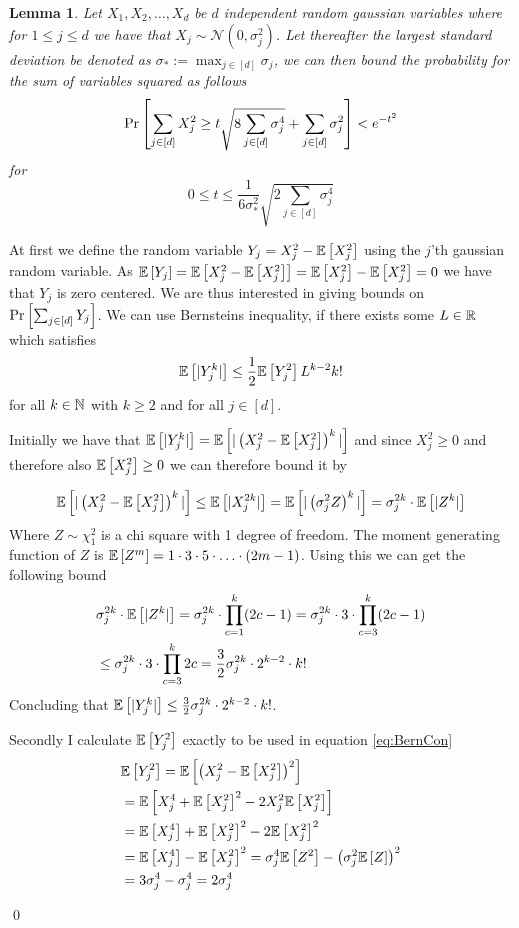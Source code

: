 \documentclass[a4paper,12pt]{article}
\renewenvironment{proof}{{\textit{Proof} \\}}{\qed}
\newtheorem{lemma}{Lemma}[section]
\begin{document}
\begin{lemma}
\label{lem:Bernstein}
Let $X_1, X_2, \dots , X_d$ be $d$ independent random gaussian variables 
where for $ 1 \le j \le d$ we have that $X_j \sim \mathcal{N}(0, \sigma_j^2)$.
Let thereafter the largest standard deviation be denoted as $\sigma_* := \max_{j \in [d]} \sigma_j$,
we can then bound the probability for the sum of variables squared as follows 
\[
\Pr\left [\sum_{j \in [d]} X_j^2  \ge 
    t \sqrt{8 \sum_{j \in [d]} \sigma_j^4} +
    \sum_{j \in [d]} \sigma_j^2  \right] < e^{-t^2}
\]
for
\[
0 \le t \le 
    \frac{1}{6 \sigma_*^2} \sqrt{2 \sum_{j \in [d]} \sigma_j^4}
\]
\end{lemma}
\begin{proof}
At first we define the random variable $Y_j = X_j^2 - \mathbb{E} \left [ X_j^2  \right]$ 
using the $j$'th gaussian random variable.
As $\mathbb{E} \left [ Y_j  \right] = \mathbb{E} \left [ X_j^2 - \mathbb{E} \left [ X_j^2  \right]  \right] = \mathbb{E} \left [ X_j^2  \right] - \mathbb{E} \left [ X_j^2  \right] = 0$ 
we have that $Y_j$ is zero centered. We are thus interested in giving bounds on
$\Pr\left [\sum_{j \in [d]} Y_j \right]$. 
We can use Bernsteins inequality, if there exists some $L \in \mathbb{R}$ which satisfies 
\begin{equation}
\label{eq:BernCon}
    \mathbb{E} \left [  |Y^k_j|   \right] \le \frac{1}{2} \mathbb{E} \left [ Y_j^2  \right] L^{k-2} k!
\end{equation}
for all $k \in \mathbb{N}$ with $k \ge 2$ and for all $j \in [d]$. \cite{wainwright_2019}

Initially we have that $\mathbb{E} \left [  |Y_j^k|   \right] = \mathbb{E} \left [  |\left (X_j^2 - \mathbb{E} \left [ X_j^2  \right]\right)^k|  \right]$
and since $X_j^2 \ge 0$ and therefore also $\mathbb{E} \left [ X_j^2  \right] \ge 0$ 
we can therefore bound it by

\[
    \mathbb{E} \left [  |\left (X_j^2 - \mathbb{E} \left [ X_j^2  \right]\right)^k|  \right] \le \mathbb{E} \left [  | X_j^{2k} |   \right] =
    \mathbb{E} \left [  | \left (\sigma_j^2 Z\right)^{k} |   \right] = 
    \sigma_j^{2k} \cdot \mathbb{E} \left [  |Z^{k} |   \right]
\]
Where $Z \sim \chi^2_1$ is a chi square with 1 degree of freedom.
The moment generating function of $Z$ is 
$\mathbb{E} \left [ Z^m  \right] = 1 \cdot 3 \cdot 5 \cdot \ldots \cdot (2m - 1) $.
Using this we can get the following bound
\begin{align*}
    &\sigma_j^{2k} \cdot \mathbb{E} \left [  |Z^{k} |   \right] =
    \sigma_j^{2k} \cdot \prod_{c=1}^k(2c-1) =
    \sigma_j^{2k} \cdot 3\cdot \prod_{c=3}^k (2c-1) \\
    &\le \sigma_j^{2k} \cdot 3 \cdot \prod_{c=3}^k 2c
    = \frac{3}{2}\sigma_j^{2k} \cdot 2^{k-2} \cdot k!
\end{align*}
Concluding that $\mathbb{E} \left [  |Y_j^k|   \right] \le \frac{3}{2}\sigma_j^{2k} \cdot 2^{k-2} \cdot k!$.

\noindent Secondly I calculate $\mathbb{E} \left [ Y_j^2  \right]$ exactly to be used in equation \ref{eq:BernCon}
\begin{align}
\label{eq:ExpY2:1}
    &\mathbb{E} \left [ Y_j^2  \right] = 
    \mathbb{E} \left [ \left (X_j^2 - \mathbb{E} \left [ X_j^2  \right]\right)^2  \right] \\
    &=\mathbb{E} \left [ X_j^4 + \mathbb{E} \left [ X_j^2  \right]^2 - 2X_j^2\mathbb{E} \left [ X_j^2  \right]  \right] \\
    &=\mathbb{E} \left [ X_j^4  \right] + \mathbb{E} \left [ X_j^2  \right]^2 - 2\mathbb{E} \left [ X_j^2  \right]^2 \\
    &=\mathbb{E} \left [ X_j^4  \right]  - \mathbb{E} \left [ X_j^2  \right]^2 =
    \sigma_j^4\mathbb{E} \left [ Z^2  \right]  - \left (\sigma_j^2\mathbb{E} \left [ Z  \right]\right)^2 \\
\label{eq:ExpY2:2}
    &=3\sigma_j^4  - \sigma_j^4 =
    2\sigma_j^4
\end{align}


\end{proof}
\end{document}
